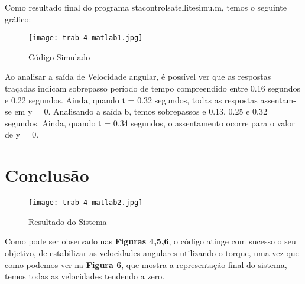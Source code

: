 \documentclass[12pt]{article}
\begin{document}
Como resultado final do programa sta\underline{\hspace{.05in}}control\underline{\hspace{.05in}}satellite\underline{\hspace{.05in}}simu.m, temos o seguinte gráfico:

\begin{figure}[H] 
    \centering
    \texttt{[image: trab 4 matlab1.jpg]}
    \caption{Código Simulado}
\end{figure}

\quad Ao analisar a saída de Velocidade angular, é possível ver que as respostas traçadas indicam sobrepasso período de tempo compreendido entre 0.16 segundos e 0.22 segundos. Ainda, quando t =
0.32 segundos, todas as respostas assentam-se em y = 0.
Analisando a saída b, temos sobrepassos e 0.13, 0.25 e 0.32
segundos. Ainda, quando t = 0.34 segundos, o assentamento ocorre para o valor de y = 0.

\section{Conclusão}

\begin{figure}[H] 
    \centering
    \texttt{[image: trab 4 matlab2.jpg]}
    \caption{Resultado do Sistema}
\end{figure}

\quad Como pode ser observado nas \textbf{Figuras 4,5,6}, o código atinge com sucesso o seu objetivo, de estabilizar as velocidades angulares utilizando o torque, uma vez que como podemos ver na \textbf{Figura 6}, que mostra a representação final do sistema, temos todas as velocidades tendendo a zero.
\end{document}
